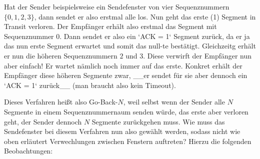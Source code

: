 Hat der Sender beispielsweise ein Sendefenster von vier Sequenznummern $\{0, 1,
2, 3\}$, dann sendet er also erstmal alle los. Nun geht das erste (1) Segment in
Transit verloren. Der Empfänger erhält also erstmal das Segment mit
Sequenznummer $0$. Dann sendet er also ein `ACK = 1` Segment zurück, da er ja
das nun erste Segment erwartet und somit das null-te bestätigt. Gleichzeitg
erhält er nun die höheren Sequenznummern $2$ und $3$. Diese verwirft der
Empfänger nun aber einfach! Er wartet nämlich noch immer auf das erste. Konkret
erhält der Empfänger diese höheren Segmente zwar, __er sendet für sie aber
dennoch ein `ACK = 1` zurück__ (man braucht also kein Timeout).

Dieses Verfahren heißt also Go-Back-$N$, weil selbst wenn der Sender alle $N$
Segmente in einem Sequenznummernaum senden würde, das erste aber verloren geht,
der Sender dennoch $N$ Segmente zurückgehen muss. Wie muss das Sendefenster bei
diesem Verfahren nun also gewählt werden, sodass nicht wie oben erläutert
Verwechlungen zwischen Fenstern auftreten? Hierzu die folgenden Beobachtungen:

